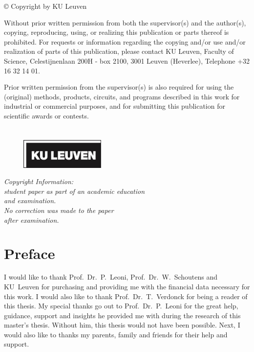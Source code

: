 \thispagestyle{empty}
\null
\newpage

\thispagestyle{empty}
\null
\vfill

© Copyright by KU Leuven

Without prior written permission from both the supervisor(s) and the author(s), copying, reproducing, using, or realizing this publication or parts thereof is prohibited. For requests or information regarding the copying and/or use and/or realization of parts of this publication, please contact KU Leuven, Faculty of Science, Celestijnenlaan 200H - box 2100, 3001 Leuven (Heverlee), Telephone +32 16 32 14 01.

Prior written permission from the supervisor(s) is also required for using the (original) methods, products, circuits, and programs described in this work for industrial or commercial purposes, and for submitting this publication for scientific awards or contests.

\newpage

\thispagestyle{empty}
\null
\newpage

\chapter*{}
\vspace*{-2cm}
\begin{figure}
  \centering
  \includegraphics[width=0.375\textwidth]{Images/KUL_black.pdf}
\end{figure}
\vspace{2.75cm}
\begin{center}
  {\LARGE\textit{Copyright Information:\\
      student paper as part of an academic education\\
      and examination.\\
      No correction was made to the paper\\
  after examination.}}
\end{center}
\newpage

\thispagestyle{empty}
\null
\newpage

\chapter{Preface}
I would like to thank Prof.~Dr.~P.~Leoni, Prof.~Dr.~W.~Schoutens and KU~Leuven for purchasing and providing me with the financial data necessary for this work. I would also like to thank Prof.~Dr.~T.~Verdonck for being a reader of this thesis. My special thanks go out to Prof.~Dr.~P.~Leoni for the great help, guidance, support and insights he provided me with during the research of this master's thesis. Without him, this thesis would not have been possible. Next, I would also like to thanks my parents, family and friends for their help and support.

